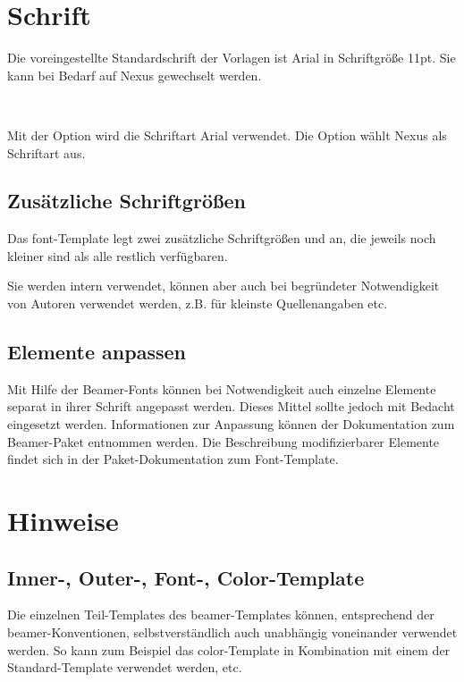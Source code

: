 \section{Schrift}

Die voreingestellte Standardschrift der Vorlagen ist Arial in Schriftgröße 11pt.
Sie kann bei Bedarf auf Nexus gewechselt werden.

\begin{Declaration}
  \\
\end{Declaration}

Mit der Option  wird die Schriftart Arial verwendet.
Die Option  wählt Nexus als Schriftart aus.

\subsection{Zusätzliche Schriftgrößen}

Das font-Template legt zwei zusätzliche Schriftgrößen 
und  an, die jeweils noch kleiner sind als alle restlich
verfügbaren.

Sie werden intern verwendet, können aber auch bei begründeter
Notwendigkeit von Autoren verwendet werden,
z.B. für kleinste Quellenangaben etc.

\subsection{Elemente anpassen}

Mit Hilfe der Beamer-Fonts können bei Notwendigkeit auch einzelne Elemente
separat in ihrer Schrift angepasst werden.
Dieses Mittel sollte jedoch mit Bedacht eingesetzt werden.
Informationen zur Anpassung können der Dokumentation zum Beamer-Paket entnommen
werden. Die Beschreibung modifizierbarer Elemente findet sich in der
Paket-Dokumentation zum Font-Template.

\section{Hinweise}

\subsection{Inner-, Outer-, Font-, Color-Template}

Die einzelnen Teil-Templates des beamer-Templates können,
entsprechend der beamer-Konventionen, selbstverständlich
auch unabhängig voneinander verwendet werden.
So kann zum Beispiel das color-Template in Kombination mit einem der
Standard-Template verwendet werden, etc.


